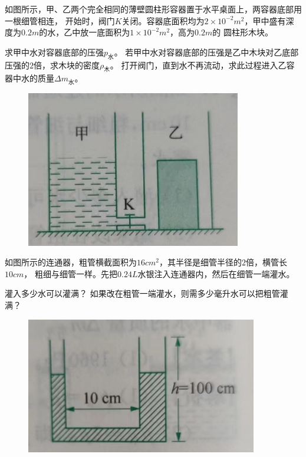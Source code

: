 \documentclass[a4paper,cs4size]{BHCexam}
\begin{document}
\begin{groups}
\begin{questions}[]
        \question[5] 如图所示，甲、乙两个完全相同的薄壁圆柱形容器置于水平桌面上，两容器底部用一根细管相连，
        开始时，阀门$K$关闭。容器底面积均为$2\times 10^{-2}m^2$，甲中盛有深度为$0.2m$的水，乙中放一底面积为$1\times 10^{-2}m^2$，高为$0.2m$的
        圆柱形木块。
        \begin{subquestions}
            \subquestion 求甲中水对容器底部的压强$p_{\text{水}}$。
            \subquestion 若甲中水对容器底部的压强是乙中木块对乙底部压强的$2$倍，求木块的密度$\rho_{\text{木}}$。
            \subquestion 打开阀门，直到水不再流动，求此过程进入乙容器中水的质量$\Delta m_{\text{水}}$。
        \end{subquestions}
        \begin{figure}[htb]
            \flushright
            \includegraphics [scale=0.4,trim=0 0 0 0]{./image/physics_pressure2_2.png}
            \label{fig:fig_pressure2_2}
        \end{figure}
        \vspace{6cm}

        \question[5] 如图所示的连通器，粗管横截面积为$16cm^2$，其半径是细管半径的$2$倍，横管长$10cm$，
        粗细与细管一样。先把$0.24L$水银注入连通器内，然后在细管一端灌水。
        \begin{subquestions}
            \subquestion 灌入多少水可以灌满？
            \subquestion 如果改在粗管一端灌水，则需多少毫升水可以把粗管灌满？
        \end{subquestions}
        \begin{figure}[htb]
            \flushright
            \includegraphics [scale=0.4,trim=0 0 0 0]{./image/physics_pressure2_3.png}
            \label{fig:fig_pressure2_3}
        \end{figure}
        \vspace{6.5cm}


\end{questions}
\end{groups}
\end{document}
